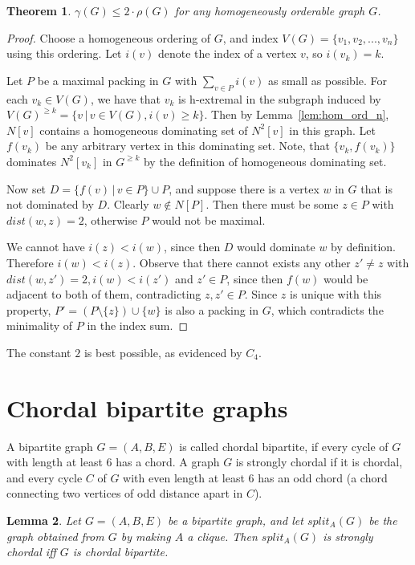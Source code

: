 \documentclass[a4paper, 12pt]{article}
\newtheorem{theorem}{Theorem}[section]
\newtheorem{lemma}[theorem]{Lemma}
\begin{document}
\begin{theorem}
    $\gamma(G) \leq 2\cdot\rho(G)$ for any homogeneously orderable graph $G$.
\end{theorem}

\begin{proof}
    Choose a homogeneous ordering of $G$, and index $V(G) = \{v_1, v_2,...,v_n\}$ using this ordering. Let $i(v)$ denote the index of a vertex $v$, so $i(v_k)=k$.

    Let $P$ be a maximal packing in $G$ with $ \sum_{v\in P}i(v) $ as small as possible. For each $v_k\in V(G)$, we have that $v_k$ is h-extremal in the subgraph induced by $V(G)^{\geq k}=\{v \, | \, v \in V(G), i(v) \geq k\}$. Then by Lemma~\ref{lem:hom_ord_n}, $N[v]$ contains a homogeneous dominating set of $N^2[v]$ in this graph. Let $f(v_k)$ be any arbitrary vertex in this dominating set. Note, that $\{v_k, f(v_k)\}$ dominates $N^2[v_k]$ in $G^{\geq k}$ by the definition of homogeneous dominating set.
    
    Now set $D=\{f(v)\, | \, v\in P\}\cup P$, and suppose there is a vertex $w$ in $G$ that is not dominated by $D$. Clearly $w \not\in N[P]$. Then there must be some $z \in P$ with $dist(w, z) = 2$, otherwise $P$ would not be maximal.
    
    We cannot have $i(z) < i(w)$, since then $D$ would dominate $w$ by definition. Therefore $i(w) < i(z)$. Observe that there cannot exists any other $z' \not= z$ with $dist(w,z') = 2, i(w) < i(z')$ and $z' \in P$, since then $f(w)$ would be adjacent to both of them, contradicting $z, z' \in P$. Since $z$ is unique with this property, $P' = (P\setminus\{z\})\cup\{w\}$ is also a packing in $G$, which contradicts the minimality of $P$ in the index sum.
\end{proof}

The constant $2$ is best possible, as evidenced by $C_4$.

\section{Chordal bipartite graphs}

A bipartite graph $G=(A,B,E)$ is called chordal bipartite, if every cycle of $G$ with length at least $6$ has a chord. A graph $G$ is strongly chordal if it is chordal, and every cycle $C$ of $G$ with even length at least $6$ has an odd chord (a chord connecting two vertices of odd distance apart in $C$).

\begin{lemma}{\cite{brandstadt1999graph}}\label{lem:split_lemma}
    Let $G=(A,B,E)$ be a bipartite graph, and let $split_A(G)$ be the graph obtained from $G$ by making $A$ a clique. Then $split_A(G)$ is strongly chordal iff $G$ is chordal bipartite.
\end{lemma}
\end{document}
